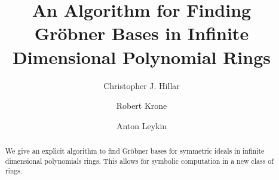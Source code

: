 \documentclass{amsart}
\theoremstyle{definition}
\theoremstyle{remark}
\numberwithin{equation}{section}
\newcommand{\<}{\langle}
\renewcommand{\>}{\rangle}
\begin{document}
 \title[Algorithms for Symmetric Gr\"obner Bases]
{An Algorithm for Finding \\  Gr\"obner Bases in Infinite \\ Dimensional Polynomial Rings}

\author{Christopher J. Hillar}
\address{Redwood Center for Theoretical Neuroscience, University of California, Berkeley}

\author{Robert Krone}
\address{Georgia Tech University, Atlanta, GA}

\author{Anton Leykin}
\address{Georgia Tech University, Atlanta, GA}


%




\begin{abstract}
We give an explicit algorithm to find Gr\"obner bases for symmetric
ideals in infinite dimensional polynomials rings.  This allows for symbolic computation
in a new class of rings.
\end{abstract} 

\maketitle 
\end{document}
